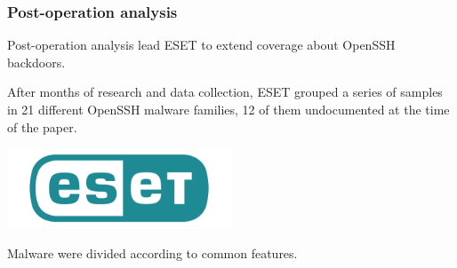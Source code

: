 \begin{frame}
	\frametitle{Post-operation analysis}
	
	Post-operation analysis lead ESET to extend coverage about OpenSSH backdoors.
	
	\smallskip

	After months of research and data collection, ESET grouped a series of samples in 21 different OpenSSH malware families, 12 of them undocumented at the time of the paper. 
	
	\begin{center}    
  \includegraphics[width=0.5\textwidth]{images/eset-logo}
  \end{center}

	\smallskip

  Malware were divided according to common features.  
	
\end{frame}


